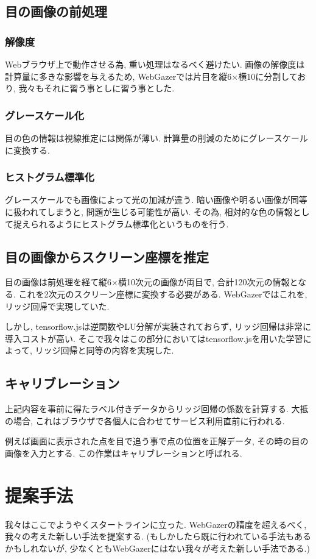 \documentclass[a4paper,11pt]{jsarticle}
\begin{document}
\subsection{目の画像の前処理}
\subsubsection{解像度}
Webブラウザ上で動作させる為, 重い処理はなるべく避けたい. 
画像の解像度は計算量に多きな影響を与えるため, WebGazerでは片目を縦6×横10に分割しており, 我々もそれに習う事としに習う事とした.

\subsubsection{グレースケール化}
目の色の情報は視線推定には関係が薄い. 
計算量の削減のためにグレースケールに変換する.

\subsubsection{ヒストグラム標準化}
グレースケールでも画像によって光の加減が違う. 
暗い画像や明るい画像が同等に扱われてしまうと, 問題が生じる可能性が高い.
その為, 相対的な色の情報として捉えられるようにヒストグラム標準化というものを行う.

\subsection{目の画像からスクリーン座標を推定}
目の画像は前処理を経て縦6×横10次元の画像が両目で, 合計120次元の情報となる.
これを2次元のスクリーン座標に変換する必要がある.
WebGazerではこれを, リッジ回帰で実現していた.

しかし, tensorflow.jsは逆関数やLU分解が実装されておらず, リッジ回帰は非常に導入コストが高い.
そこで我々はこの部分においてはtensorflow.jsを用いた学習によって, リッジ回帰と同等の内容を実現した.

\subsection{キャリブレーション}
上記内容を事前に得たラベル付きデータからリッジ回帰の係数を計算する.
大抵の場合, これはブラウザで各個人に合わせてサービス利用直前に行われる.

例えば画面に表示された点を目で追う事で点の位置を正解データ, その時の目の画像を入力とする.
この作業はキャリブレーションと呼ばれる.

\section{提案手法}
我々はここでようやくスタートラインに立った.
WebGazerの精度を超えるべく, 我々の考えた新しい手法を提案する. 
(もしかしたら既に行われている手法もあるかもしれないが, 少なくともWebGazerにはない我々が考えた新しい手法である.)
\end{document}
